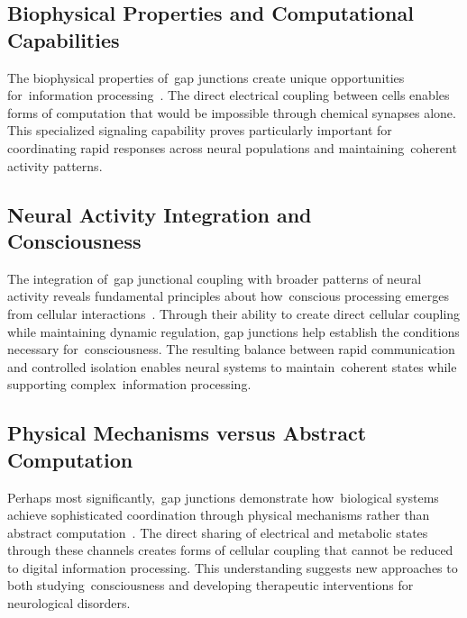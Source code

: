 \subsection*{Biophysical Properties and Computational Capabilities~}

The biophysical properties of~gap junctions create unique opportunities for~information processing~\cite{Palacios-Prado2009, pinotsis2023cytoelectric}. The direct electrical coupling between cells enables forms of computation that would be impossible through chemical synapses alone. This specialized signaling capability proves particularly important for coordinating rapid responses across neural populations and maintaining~coherent activity patterns.

\subsection*{Neural Activity Integration and Consciousness~~}

The integration of~gap junctional coupling with broader patterns of neural activity reveals fundamental principles about how~conscious processing emerges from cellular interactions~\cite{Nielsen2012, hunt2024electromagnetic}. Through their ability to create direct cellular coupling while maintaining dynamic regulation, gap junctions help establish the conditions necessary for~consciousness. The resulting balance between rapid communication and controlled isolation enables neural systems to maintain~coherent states while supporting complex~information processing.

\subsection*{Physical Mechanisms versus Abstract Computation~~}

Perhaps most significantly,~gap junctions demonstrate how~biological systems achieve sophisticated coordination through physical mechanisms rather than abstract computation~\cite{Bennett2004, Hameroff2014}. The direct sharing of electrical and metabolic states through these channels creates forms of cellular coupling that cannot be reduced to digital information processing. This understanding suggests new approaches to both studying~consciousness and developing therapeutic interventions for neurological disorders.

